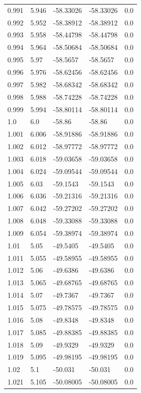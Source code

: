 \begin{tabular}{lllll}
0.991 & 5.946 & -58.33026 & -58.33026 & 0.0 \\
0.992 & 5.952 & -58.38912 & -58.38912 & 0.0 \\
0.993 & 5.958 & -58.44798 & -58.44798 & 0.0 \\
0.994 & 5.964 & -58.50684 & -58.50684 & 0.0 \\
0.995 & 5.97 & -58.5657 & -58.5657 & 0.0 \\
0.996 & 5.976 & -58.62456 & -58.62456 & 0.0 \\
0.997 & 5.982 & -58.68342 & -58.68342 & 0.0 \\
0.998 & 5.988 & -58.74228 & -58.74228 & 0.0 \\
0.999 & 5.994 & -58.80114 & -58.80114 & 0.0 \\
1.0 & 6.0 & -58.86 & -58.86 & 0.0 \\
1.001 & 6.006 & -58.91886 & -58.91886 & 0.0 \\
1.002 & 6.012 & -58.97772 & -58.97772 & 0.0 \\
1.003 & 6.018 & -59.03658 & -59.03658 & 0.0 \\
1.004 & 6.024 & -59.09544 & -59.09544 & 0.0 \\
1.005 & 6.03 & -59.1543 & -59.1543 & 0.0 \\
1.006 & 6.036 & -59.21316 & -59.21316 & 0.0 \\
1.007 & 6.042 & -59.27202 & -59.27202 & 0.0 \\
1.008 & 6.048 & -59.33088 & -59.33088 & 0.0 \\
1.009 & 6.054 & -59.38974 & -59.38974 & 0.0 \\
1.01 & 5.05 & -49.5405 & -49.5405 & 0.0 \\
1.011 & 5.055 & -49.58955 & -49.58955 & 0.0 \\
1.012 & 5.06 & -49.6386 & -49.6386 & 0.0 \\
1.013 & 5.065 & -49.68765 & -49.68765 & 0.0 \\
1.014 & 5.07 & -49.7367 & -49.7367 & 0.0 \\
1.015 & 5.075 & -49.78575 & -49.78575 & 0.0 \\
1.016 & 5.08 & -49.8348 & -49.8348 & 0.0 \\
1.017 & 5.085 & -49.88385 & -49.88385 & 0.0 \\
1.018 & 5.09 & -49.9329 & -49.9329 & 0.0 \\
1.019 & 5.095 & -49.98195 & -49.98195 & 0.0 \\
1.02 & 5.1 & -50.031 & -50.031 & 0.0 \\
1.021 & 5.105 & -50.08005 & -50.08005 & 0.0 \\

\end{tabular}
